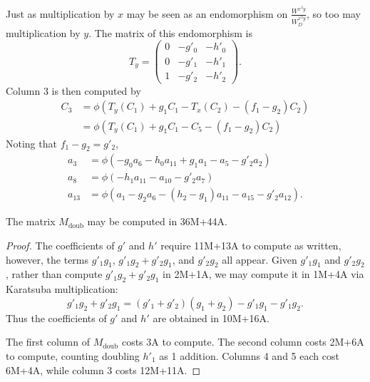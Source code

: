 Just as multiplication by $x$ may be seen as an endomorphism on $\frac {W^{x^2y}}{W_D^{x^2y}}$,
so too may multiplication by $y$. The matrix of this endomorphism is
\[ T_y = \begin{pmatrix}
    0 & -g'_0 & -h'_0 \\
    0 & -g'_1 & -h'_1 \\
    1 & -g'_2 & -h'_2
  \end{pmatrix}. \]
Column 3 is then computed by
\begin{align*}
  C_3 &= \phi \left( T_y(C_1) + g_1C_1 - T_x(C_2) - (f_1 - g_2)C_2 \right) \\
      &= \phi \left( T_y(C_1) + g_1C_1 - C_5 - (f_1 - g_2)C_2 \right)
\end{align*}
Noting that $f_1 - g_2 = g'_2$,
\begin{align*}
  a_3    &= \phi \left(     - g_0a_6 - h_0a_{11} + g_1a_1    - a_5    - g'_2a_2    \right) \\
  a_8    &= \phi \left(              - h_1a_{11}             - a_{10} - g'_2a_7    \right) \\
  a_{13} &= \phi \left( a_1 - g_2a_6 - (h_2 - g_1)a_{11}     - a_{15} - g'_2a_{12} \right) .
\end{align*}
\begin{comment}
\begin{align*}
  a_3    &= \phi \left(     - g_0a_6 - h_0a_{11} + g_1a_1    - a_5    - (f_1 - g_2)a_2    \right) \\
  a_8    &= \phi \left(              - h_1a_{11}             - a_{10} - (f_1 - g_2)a_7    \right) \\
  a_{13} &= \phi \left( a_1 - g_2a_6 - (h_2 - g_1)a_{11}     - a_{15} - (f_1 - g_2)a_{12} \right) .
\end{align*}
\end{comment}

\begin{lemma}
  \label{lem_Mdoub_op_count}
  The matrix $M_{\text{doub}}$ may be computed in 36M+44A.
\end{lemma}
\begin{proof}
  The coefficients of $g'$ and $h'$ require 11M+13A to compute as written,
  however, the terms $g'_1g_1$, $g'_1g_2 + g'_2g_1$, and $g'_2g_2$ all appear.
  Given $g'_1g_1$ and $g'_2g_2$, rather than compute $g'_1g_2 + g'_2g_1$ in 2M+1A,
  we may compute it in 1M+4A via Karatsuba multiplication:
  \[ g'_1g_2 + g'_2g_1 = (g'_1 + g'_2)(g_1 + g_2) - g'_1g_1 - g'_1g_2. \]
  Thus the coefficients of $g'$ and $h'$ are obtained in 10M+16A.
  
  The first column of $M_{\text{doub}}$ costs 3A to compute.
  The second column costs 2M+6A to compute, counting doubling $h'_1$ as 1 addition.
  Columns 4 and 5 each cost 6M+4A, while column 3 costs 12M+11A.
\end{proof}



